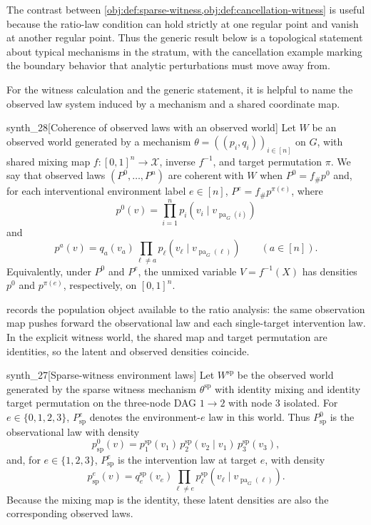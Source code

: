 The contrast between \cref{obj:def:sparse-witness,obj:def:cancellation-witness} is useful because the ratio-law condition can hold strictly at one regular point and vanish at another regular point. Thus the generic result below is a topological statement about typical mechanisms in the stratum, with the cancellation example marking the boundary behavior that analytic perturbations must move away from.

For the witness calculation and the generic statement, it is helpful to name the observed law system induced by a mechanism and a shared coordinate map.

\begin{definitionv}{synth_28}[Coherence of observed laws with an observed world]
Let \(W\) be an observed world generated by a mechanism \(\theta=((p_i,q_i))_{i\in[n]}\) on \(G\), with shared mixing map \(f:[0,1]^n\to\mathcal X\), inverse \(f^{-1}\), and target permutation \(\pi\). We say that observed laws \((P^0,\ldots,P^n)\) are \(\mathrm{coherent\ with}\) \(W\) when \(P^0=f_{\#}p^0\) and, for each interventional environment label \(e\in[n]\), \(P^e=f_{\#}p^{\pi(e)}\), where
\[
p^0(v)=\prod_{i=1}^{n}p_i(v_i\mid v_{\operatorname{pa}_G(i)})
\]
and
\[
p^a(v)=q_a(v_a)\prod_{\ell\ne a}p_\ell(v_\ell\mid v_{\operatorname{pa}_G(\ell)})
\qquad(a\in[n]).
\]
Equivalently, under \(P^0\) and \(P^e\), the unmixed variable \(V=f^{-1}(X)\) has densities \(p^0\) and \(p^{\pi(e)}\), respectively, on \([0,1]^n\).
\end{definitionv}

 records the population object available to the ratio analysis: the same observation map pushes forward the observational law and each single-target intervention law. In the explicit witness world, the shared map and target permutation are identities, so the latent and observed densities coincide.

\begin{definitionv}{synth_27}[Sparse-witness environment laws]
Let \(W^{\mathrm{sp}}\) be the observed world generated by the sparse witness mechanism \(\theta^{\mathrm{sp}}\) with identity mixing and identity target permutation on the three-node DAG \(1\to2\) with node \(3\) isolated. For \(e\in\{0,1,2,3\}\), \(P^e_{\mathrm{sp}}\) denotes the environment-\(e\) law in this world. Thus \(P^0_{\mathrm{sp}}\) is the observational law with density
\[
p^0_{\mathrm{sp}}(v)
=
p^{\mathrm{sp}}_1(v_1)\,
p^{\mathrm{sp}}_2(v_2\mid v_1)\,
p^{\mathrm{sp}}_3(v_3),
\]
and, for \(e\in\{1,2,3\}\), \(P^e_{\mathrm{sp}}\) is the intervention law at target \(e\), with density
\[
p^e_{\mathrm{sp}}(v)
=
q^{\mathrm{sp}}_e(v_e)
\prod_{\ell\ne e}
p^{\mathrm{sp}}_\ell(v_\ell\mid v_{\operatorname{pa}_G(\ell)}).
\]
Because the mixing map is the identity, these latent densities are also the corresponding observed laws.
\end{definitionv}

